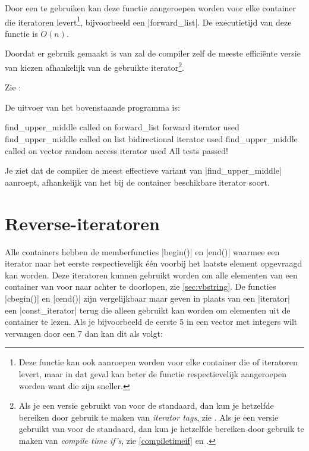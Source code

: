 \begin{cpplstShortInline}
Door een  te gebruiken kan deze functie aangeroepen worden voor elke container die  iteratoren levert\footnote{%
	Deze functie kan ook aanroepen worden voor elke container die  of  iteratoren levert, maar in dat geval kan beter de functie  respectievelijk  aangeroepen worden want die zijn sneller.
}, bijvoorbeeld een |forward_list|.
De executietijd van deze functie is $O(n)$.

Doordat er gebruik gemaakt is van  zal de compiler zelf de meeste efficiënte versie van  kiezen afhankelijk van de gebruikte iterator\footnote{%
	Als je een \Cpp versie gebruikt van voor de  standaard, dan kun je hetzelfde bereiken door gebruik te maken van \emph{iterator tags}, zie .
	Als je een \Cpp versie gebruikt van voor de  standaard, dan kun je hetzelfde bereiken door gebruik te maken van \emph{compile time if's}, zie \cref{compiletimeif} en .
}.

Zie :

De uitvoer van het bovenstaande programma is:
\begin{coutput}
find_upper_middle called on forward_list
forward iterator used
find_upper_middle called on list
bidirectional iterator used
find_upper_middle called on vector
random access iterator used
All tests passed!
\end{coutput}

Je ziet dat de compiler de meest effectieve variant van |find_upper_middle| aanroept, afhankelijk van het bij de container beschikbare iterator soort.

\section{Reverse\hyp{}iteratoren}
\label{sec:revitr}
Alle containers hebben de memberfuncties |begin()| en |end()| waarmee een iterator naar het eerste respectievelijk één voorbij het laatste element opgevraagd kan worden.
Deze iteratoren kunnen gebruikt worden om alle elementen van een container van voor naar achter te doorlopen, zie \cref{sec:vbstring}.
De functies |cbegin()| en |cend()| zijn vergelijkbaar maar geven in plaats van een |iterator| een |const_iterator| terug die alleen gebruikt kan worden om elementen uit de container te lezen.
Als je bijvoorbeeld de eerste 5 in een vector met integers wilt vervangen door een 7 dan kan dit als volgt:


\end{cpplstShortInline}
